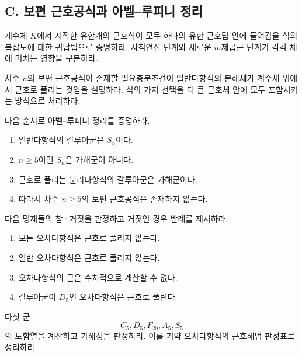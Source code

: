 \subsection*{C. 보편 근호공식과 아벨--루피니 정리}

\begin{exercise}[*]
계수체 $K$에서 시작한 유한개의 근호식이 모두 하나의 유한 근호탑 안에 들어감을 식의 복잡도에 대한 귀납법으로 증명하라. 사칙연산 단계와 새로운 $m$제곱근 단계가 각각 체에 미치는 영향을 구분하라.
\end{exercise}

\begin{exercise}
차수 $n$의 보편 근호공식이 존재할 필요충분조건이 일반다항식의 분해체가 계수체 위에서 근호로 풀리는 것임을 설명하라. 식의 가지 선택을 더 큰 근호체 안에 모두 포함시키는 방식으로 처리하라.
\end{exercise}

\begin{exercise}[*]
다음 순서로 아벨--루피니 정리를 증명하라.
\begin{enumerate}[label=(\alph*)]
  \item 일반다항식의 갈루아군은 $S_n$이다.
  \item $n\ge5$이면 $S_n$은 가해군이 아니다.
  \item 근호로 풀리는 분리다항식의 갈루아군은 가해군이다.
  \item 따라서 차수 $n\ge5$의 보편 근호공식은 존재하지 않는다.
\end{enumerate}
\end{exercise}

\begin{exercise}
다음 명제들의 참·거짓을 판정하고 거짓인 경우 반례를 제시하라.
\begin{enumerate}[label=(\alph*)]
  \item 모든 오차다항식은 근호로 풀리지 않는다.
  \item 일반 오차다항식은 근호로 풀리지 않는다.
  \item 오차다항식의 근은 수치적으로 계산할 수 없다.
  \item 갈루아군이 $D_5$인 오차다항식은 근호로 풀린다.
\end{enumerate}
\end{exercise}

\begin{exercise}[*]
다섯 군
\[
  C_5,D_5,F_{20},A_5,S_5
\]
의 도함열을 계산하고 가해성을 판정하라. 이를 기약 오차다항식의 근호해법 판정표로 정리하라.
\end{exercise}

